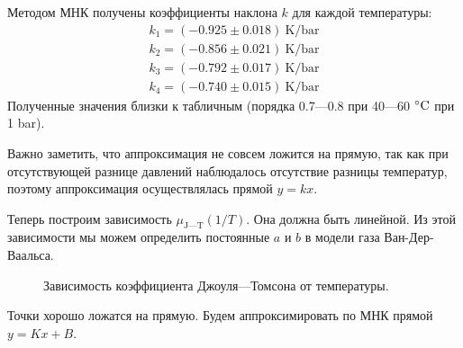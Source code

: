 \documentclass[a4paper,12pt]{report}
\begin{document}
    \begin{multicols}{2}
        Методом МНК получены коэффициенты наклона $k$ для каждой температуры:
        \begin{align*}
            k_1=(-0.925\pm 0.018)\ \text{K}/\text{bar}\\
            k_2=(-0.856\pm 0.021)\ \text{K}/\text{bar}\\
            k_3=(-0.792\pm 0.017)\ \text{K}/\text{bar}\\
            k_4=(-0.740\pm 0.015)\ \text{K}/\text{bar}
        \end{align*}
        Полученные значения близки к табличным (порядка 0.7---0.8 при 40---60 $\celsius$ при 1 bar).

        Важно заметить, что аппроксимация не совсем ложится на прямую, так как при отсутствующей разнице давлений наблюдалось отсутствие разницы температур, поэтому аппроксимация осуществлялась прямой $y=kx$.

        Теперь построим зависимость $\mu_\text{J---T}(1/T)$. Она должна быть линейной. Из этой зависимости мы можем определить постоянные $a$ и $b$ в модели газа Ван-Дер-Ваальса.
        \begin{figure}[H]
            \centering
            \caption{Зависимость коэффициента Джоуля---Томсона от температуры.}
        \end{figure}
        Точки хорошо ложатся на прямую. Будем аппроксимировать по МНК прямой $y=Kx+B$.


\end{multicols}
\end{document}
